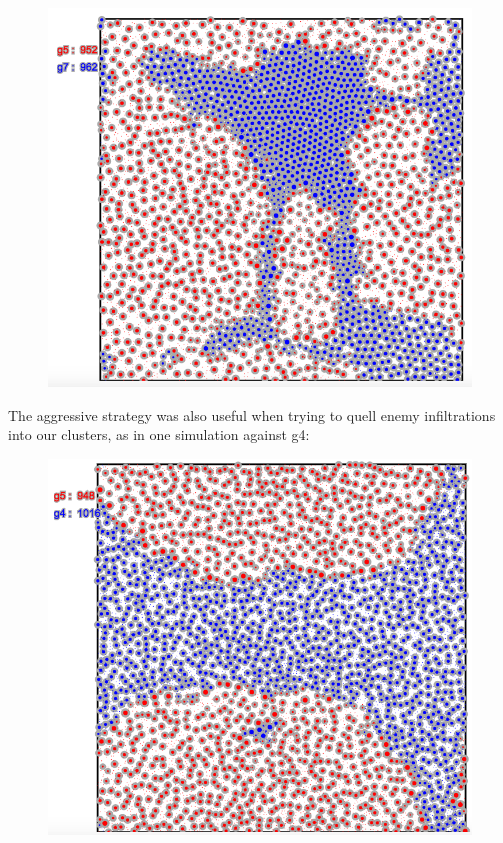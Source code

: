 \begin{figure}[h]
\center
\includegraphics[scale=0.3]{tourn4.png}
\caption{}
\label{fig:tourn4}
\end{figure}
\clearpage
The aggressive strategy was also useful when trying to quell enemy infiltrations into our clusters, as in one simulation against g4:\\
\begin{figure}[h]
\center
\includegraphics[scale=0.3]{tourn5.png}
\caption{}
\label{fig:tourn5}
\end{figure}

